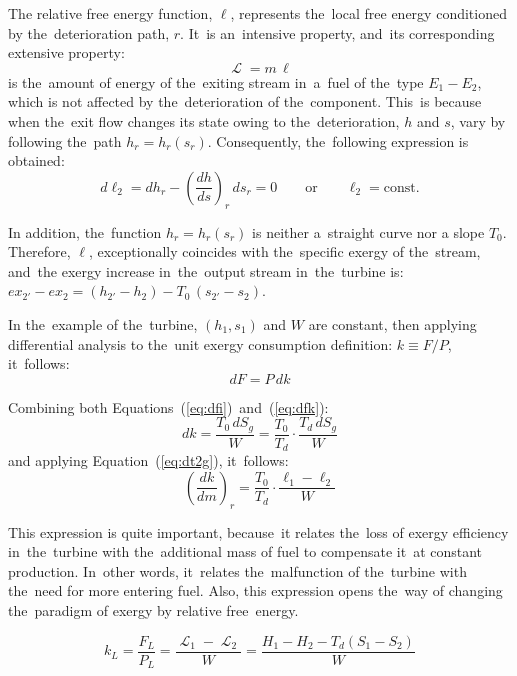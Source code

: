 \documentclass[energies,article,accept,moreauthors,pdftex]{Definitions/mdpi}
\DeclareMathOperator{\Lgdr}{\mathcal{L}}
\begin{document}
The relative free energy function, $\ell$, represents the~local free energy conditioned by the~deterioration path, $r$. It~is an~intensive property, and~its corresponding extensive property:
\begin{equation}
\Lgdr = m\,\ell
\end{equation}
is the~amount of energy of the~exiting stream in~a~fuel of the~type $E_1-E_2$, which is not affected by the~deterioration of the~component. This~is because when the~exit flow changes its state owing to the~deterioration, $h$ and $s$, vary by following the~path $h_r = h_r (s_r)$. Consequently, the~following expression is obtained:
\begin{equation}
d\ell_2 = dh_r - \left(\frac{dh}{ds}\right)_r\, ds_r = 0 \qquad  \text{or} \qquad \ell_2 = \text{const}.
\end{equation}

In addition, the~function $h_r = h_r(s_r)$ is neither a~straight curve nor a slope $T_0$. Therefore, $\ell$, exceptionally coincides with the~specific exergy of the~stream, and~the exergy increase in~the~output stream in~the~turbine is: $ex_{2'}-ex_{2}=(h_{2'}-h_2)-T_0\,(s_{2'}-s_2)$.

In the~example of the~turbine, $(h_1, s_1)$ and $W$ are constant, then applying differential analysis to the~unit exergy consumption definition: $k\equiv F/P$, it~follows:
\begin{equation}
dF=P\,dk
\label{eq:dfk}
\end{equation}

Combining both Equations~(\ref{eq:dfi})~and~(\ref{eq:dfk}):
\begin{equation}
dk=\frac{T_0\,dS_g}{W}=\frac{T_0}{T_d}\cdot\frac{T_d \, dS_g}{W}
\end{equation}
and applying Equation~(\ref{eq:dt2g}), it~follows:
\begin{equation}
\left(\frac{dk}{dm}\right)_r = \frac{T_0}{T_d} \cdot \frac{\ell_1 - \ell_2}{W}
\end{equation}

This expression is quite important, because~it relates the~loss of exergy efficiency in~the~turbine with the~additional mass of fuel to compensate it~at constant production. In~other words, it~relates the~malfunction of the~turbine with the~need for more entering fuel. Also, this expression opens the~way of changing the~paradigm of exergy by relative free~energy.

\begin{equation}
k_L = \frac{F_L}{P_L} = \frac{\Lgdr_1 - \Lgdr_2}{W}=\frac{H_1-H_2-T_d \left(S_1 - S_2\right)}{W}
\label{eq:kL}
\end{equation}
\end{document}
